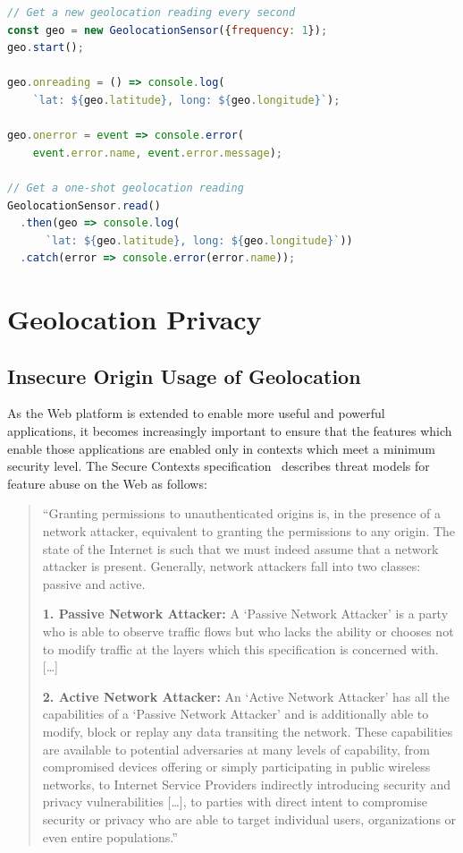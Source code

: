 \documentclass[sigconf,hyphens]{acmart}
\begin{document}
\begin{lstlisting}[caption={Geolocation Sensor \textsc{api}},
  label=code:geolocationsensor, language=JavaScript, float=t] 
// Get a new geolocation reading every second
const geo = new GeolocationSensor({frequency: 1});
geo.start();

geo.onreading = () => console.log(
    `lat: ${geo.latitude}, long: ${geo.longitude}`);

geo.onerror = event => console.error(
    event.error.name, event.error.message);

// Get a one-shot geolocation reading
GeolocationSensor.read()
  .then(geo => console.log(
      `lat: ${geo.latitude}, long: ${geo.longitude}`))
  .catch(error => console.error(error.name));
\end{lstlisting}

\section{Geolocation Privacy}

\subsection{Insecure Origin Usage of Geolocation}

As the Web platform is extended to enable more useful and powerful applications,
it becomes increasingly important to ensure that the features
which enable those applications are enabled only in contexts
which meet a minimum security level.
The Secure Contexts specification~\cite{west2016securecontexts}
describes threat models for feature abuse on the Web as follows:

\begin{quote}
``Granting permissions to unauthenticated origins is, in the presence of a network attacker,
equivalent to granting the permissions to any origin.
The state of the Internet is such that we must indeed assume that a network attacker is present.
Generally, network attackers fall into two classes: passive and active.

\textbf{1. Passive Network Attacker:} A `Passive Network Attacker' is a party
who is able to observe traffic flows but who lacks the ability
or chooses not to modify traffic at the layers which this specification is concerned with. [\ldots]

\textbf{2. Active Network Attacker:} An `Active Network Attacker' has all the capabilities
of a `Passive Network Attacker' and is additionally able to modify, block or replay
any data transiting the network.
These capabilities are available to potential adversaries at many levels of capability,
from compromised devices offering or simply participating in public wireless networks,
to Internet Service Providers indirectly introducing security and privacy vulnerabilities [\ldots],
to parties with direct intent to compromise security or privacy who are able to target individual users,
organizations or even entire populations.''
\end{quote}
\end{document}
